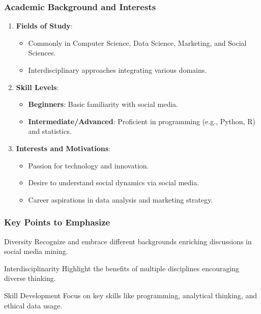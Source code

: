 \documentclass{beamer}
\begin{document}
\begin{frame}[fragile]
    \frametitle{Academic Background and Interests}
    \begin{enumerate}
        \item \textbf{Fields of Study}:
        \begin{itemize}
            \item Commonly in Computer Science, Data Science, Marketing, and Social Sciences.
            \item Interdisciplinary approaches integrating various domains.
        \end{itemize}
        \item \textbf{Skill Levels}:
        \begin{itemize}
            \item \textbf{Beginners}: Basic familiarity with social media.
            \item \textbf{Intermediate/Advanced}: Proficient in programming (e.g., Python, R) and statistics.
        \end{itemize}
        \item \textbf{Interests and Motivations}:
        \begin{itemize}
            \item Passion for technology and innovation.
            \item Desire to understand social dynamics via social media.
            \item Career aspirations in data analysis and marketing strategy.
        \end{itemize}
    \end{enumerate}
\end{frame}

\begin{frame}[fragile]
    \frametitle{Key Points to Emphasize}
    \begin{block}{Diversity}
        Recognize and embrace different backgrounds enriching discussions in social media mining.
    \end{block}
    \begin{block}{Interdisciplinarity}
        Highlight the benefits of multiple disciplines encouraging diverse thinking.
    \end{block}
    \begin{block}{Skill Development}
        Focus on key skills like programming, analytical thinking, and ethical data usage.
    \end{block}
\end{frame}
\end{document}

